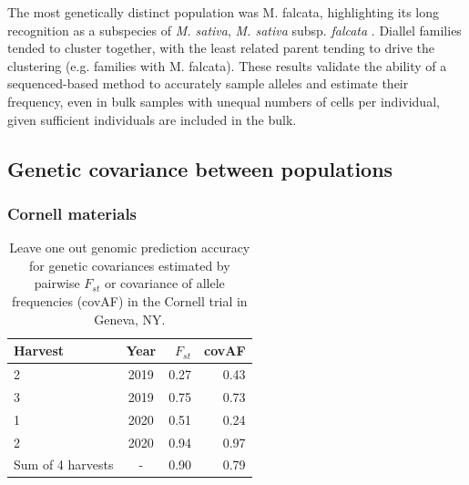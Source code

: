 \documentclass[12pt, letterpaper]{article}
\begin{document}
The most genetically distinct population was M. falcata, highlighting its long recognition as a subspecies of \emph{M. sativa}, \emph{M. sativa} subsp. \emph{falcata} \parencite{oakley1917}. Diallel families tended to cluster together, with the least related parent tending to drive the clustering (e.g. families with M. falcata). These results validate the ability of a sequenced-based method to accurately sample alleles and estimate their frequency, even in bulk samples with unequal numbers of cells per individual, given sufficient individuals are included in the bulk.



\subsection{Genetic covariance between populations}



\subsubsection{Cornell materials}

\begin{table}[t]
\caption{Leave one out genomic prediction accuracy for genetic covariances estimated by pairwise $F_{st}$ or covariance of allele frequencies (covAF) in the Cornell trial in Geneva, NY.}
\label{tab:loo}
\centering
\begin{tabular*}{\hsize}{@{\extracolsep{\fill}}lcrr}
 Harvest & Year & $F_{st}$ & covAF \\ 
  \hline
  2 & 2019 & 0.27 & 0.43 \\ 
  3 & 2019 & 0.75 & 0.73 \\ 
  1 & 2020 & 0.51 & 0.24 \\ 
  2 & 2020 & 0.94 & 0.97 \\ 
  Sum of 4 harvests & - & 0.90 & 0.79 \\ 
   \hline
\end{tabular*}
\end{table}
\end{document}
